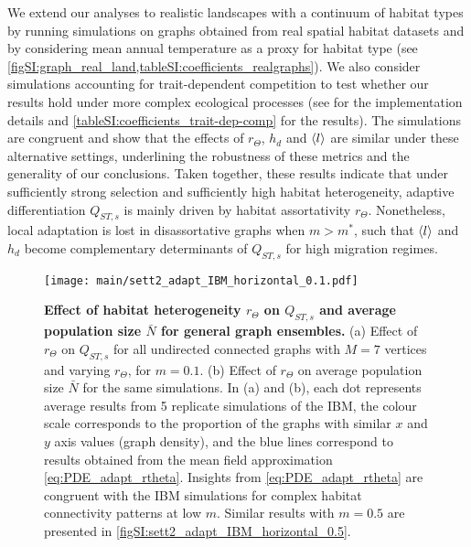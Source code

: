We extend our analyses to realistic landscapes with a continuum of habitat types by running simulations on graphs obtained from real spatial habitat datasets and by considering mean annual temperature as a proxy for habitat type (see \cref{figSI:graph_real_land,tableSI:coefficients_realgraphs}). 
%
We also consider simulations accounting for trait-dependent competition to test whether our results hold under more complex ecological processes (see  for the implementation details and \cref{tableSI:coefficients_trait-dep-comp} for the results). 
%
The simulations are congruent and show that the effects of $r_\Theta$, $h_d$ and $\langle l \rangle$ are similar under these alternative settings, underlining the robustness of these metrics and the generality of our conclusions.
%
Taken together, these results indicate that under sufficiently strong selection and sufficiently high habitat heterogeneity, adaptive differentiation $Q_{ST,s}$ is mainly driven by habitat assortativity $r_\Theta$. 
%
Nonetheless, local adaptation is lost in disassortative graphs when $m > m^*$, such that $\langle l \rangle$ and $h_d$ become complementary determinants of $Q_{ST,s}$ for high migration regimes.

\begin{figure}[ht]
  \centering
    \texttt{[image: main/sett2\_adapt\_IBM\_horizontal\_0.1.pdf]}
    \caption{{\textbf{Effect of habitat heterogeneity $r_\Theta$ on $Q_{ST,s}$ and average population size $\bar{N}$ for general graph ensembles.} (a) Effect of $r_\Theta$ on $Q_{ST,s}$ for all undirected connected graphs with $M = 7$ vertices and varying $r_\Theta$, for $m = 0.1$. (b) Effect of $r_\Theta$ on average population size $\bar{N}$ for the same simulations. In (a) and (b), each dot represents average results from 5 replicate simulations of the IBM, the colour scale corresponds to the proportion of the graphs with similar $x$ and $y$ axis values (graph density), and the blue lines correspond to results obtained from the mean field approximation \cref{eq:PDE_adapt_rtheta}. Insights from \cref{eq:PDE_adapt_rtheta} are congruent with the IBM simulations for complex habitat connectivity patterns at low $m$. Similar results with $m=0.5$ are presented in \cref{figSI:sett2_adapt_IBM_horizontal_0.5}.}}
    \label{fig:sett2_adapt_IBM_horizontal_0.1}
\end{figure}
\FloatBarrier

